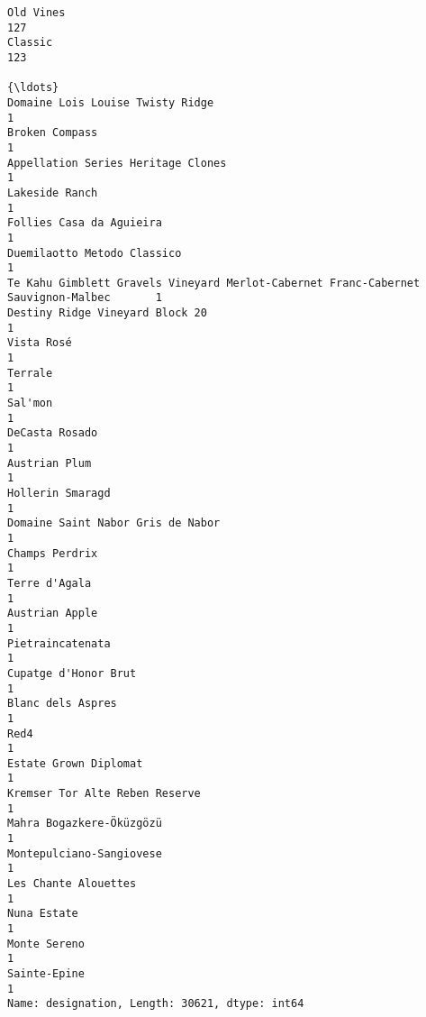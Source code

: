 \documentclass[11pt]{article}
\begin{document}
\begin{Verbatim}[commandchars=\\\{\}]
Old Vines                                                                             127
Classic                                                                               123
                                                                                     {\ldots} 
Domaine Lois Louise Twisty Ridge                                                        1
Broken Compass                                                                          1
Appellation Series Heritage Clones                                                      1
Lakeside Ranch                                                                          1
Follies Casa da Aguieira                                                                1
Duemilaotto Metodo Classico                                                             1
Te Kahu Gimblett Gravels Vineyard Merlot-Cabernet Franc-Cabernet Sauvignon-Malbec       1
Destiny Ridge Vineyard Block 20                                                         1
Vista Rosé                                                                              1
Terrale                                                                                 1
Sal'mon                                                                                 1
DeCasta Rosado                                                                          1
Austrian Plum                                                                           1
Hollerin Smaragd                                                                        1
Domaine Saint Nabor Gris de Nabor                                                       1
Champs Perdrix                                                                          1
Terre d'Agala                                                                           1
Austrian Apple                                                                          1
Pietraincatenata                                                                        1
Cupatge d'Honor Brut                                                                    1
Blanc dels Aspres                                                                       1
Red4                                                                                    1
Estate Grown Diplomat                                                                   1
Kremser Tor Alte Reben Reserve                                                          1
Mahra Bogazkere-Öküzgözü                                                                1
Montepulciano-Sangiovese                                                                1
Les Chante Alouettes                                                                    1
Nuna Estate                                                                             1
Monte Sereno                                                                            1
Sainte-Epine                                                                            1
Name: designation, Length: 30621, dtype: int64

    \end{Verbatim}
\end{document}
